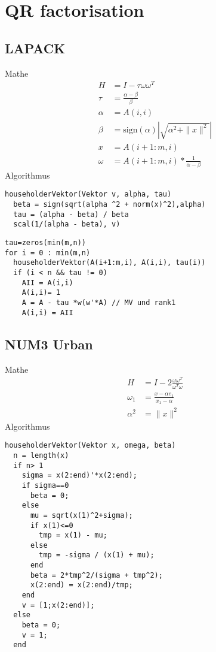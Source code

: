 \chapter{QR factorisation}

\section{LAPACK}
Mathe \cite{DGEQR2}
\begin{align}
	H &= I - \tau \omega \omega^T \\
	\tau &= \frac{\alpha - \beta}{\beta} \\
	\alpha &= A(i,i)\\
	\beta &= \text{sign}(\alpha) \left|\sqrt{\alpha^2 + \|x\|^2}\right|\\
	x &= A(i+1:m,i)\\
	\omega &= A(i+1:m,i) * \frac{1}{\alpha - \beta}
\end{align}
Algorithmus
\begin{lstlisting}
householderVektor(Vektor v, alpha, tau)
  beta = sign(sqrt(alpha ^2 + norm(x)^2),alpha)
  tau = (alpha - beta) / beta	
  scal(1/(alpha - beta), v)
\end{lstlisting}
\begin{lstlisting}
tau=zeros(min(m,n))
for i = 0 : min(m,n)
  householderVektor(A(i+1:m,i), A(i,i), tau(i)) 
  if (i < n && tau != 0)
    AII = A(i,i)
    A(i,i)= 1
    A = A - tau *w(w'*A) // MV und rank1
    A(i,i) = AII
\end{lstlisting}

\section{NUM3 Urban}
Mathe
\begin{align}
	H &= I - 2 \frac{\omega \omega^T}{\omega^T \omega}\\
	\omega_1 &= \frac{x - \alpha e_1}{x_1 - \alpha}\\
	\alpha ^2 &= \|x\|^2 
\end{align}
Algorithmus
\begin{lstlisting}
householderVektor(Vektor x, omega, beta)
  n = length(x)
  if n> 1
    sigma = x(2:end)'*x(2:end);
    if sigma==0
      beta = 0;
    else
      mu = sqrt(x(1)^2+sigma);
      if x(1)<=0
        tmp = x(1) - mu;
      else
        tmp = -sigma / (x(1) + mu);
      end
      beta = 2*tmp^2/(sigma + tmp^2);
      x(2:end) = x(2:end)/tmp;
    end
    v = [1;x(2:end)];
  else
    beta = 0;
    v = 1;
  end
\end{lstlisting}

